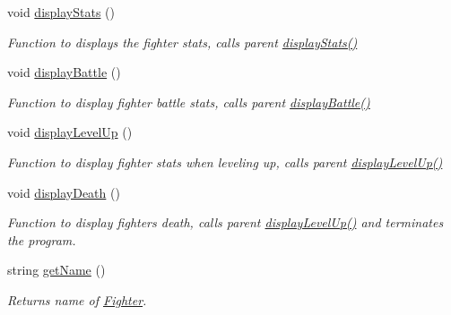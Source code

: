 \begin{DoxyCompactItemize}
\hypertarget{class_fighter_a9e63e29c35aaca0bc60ee46efe00cc62}{}\label{class_fighter_a9e63e29c35aaca0bc60ee46efe00cc62} 
void \hyperlink{class_fighter_a9e63e29c35aaca0bc60ee46efe00cc62}{display\+Stats} ()
\begin{DoxyCompactList}\small\item\em Function to displays the fighter stats, calls parent \hyperlink{class_fighter_a9e63e29c35aaca0bc60ee46efe00cc62}{display\+Stats()} \end{DoxyCompactList}\item 
\hypertarget{class_fighter_ad519375531d2f4ae2bc8896e3595d5f4}{}\label{class_fighter_ad519375531d2f4ae2bc8896e3595d5f4} 
void \hyperlink{class_fighter_ad519375531d2f4ae2bc8896e3595d5f4}{display\+Battle} ()
\begin{DoxyCompactList}\small\item\em Function to display fighter battle stats, calls parent \hyperlink{class_fighter_ad519375531d2f4ae2bc8896e3595d5f4}{display\+Battle()} \end{DoxyCompactList}\item 
\hypertarget{class_fighter_afa53e25a50772d86c5e929c6df1354ad}{}\label{class_fighter_afa53e25a50772d86c5e929c6df1354ad} 
void \hyperlink{class_fighter_afa53e25a50772d86c5e929c6df1354ad}{display\+Level\+Up} ()
\begin{DoxyCompactList}\small\item\em Function to display fighter stats when leveling up, calls parent \hyperlink{class_fighter_afa53e25a50772d86c5e929c6df1354ad}{display\+Level\+Up()} \end{DoxyCompactList}\item 
\hypertarget{class_fighter_a6a050f0b907517b09627fe16cea6e341}{}\label{class_fighter_a6a050f0b907517b09627fe16cea6e341} 
void \hyperlink{class_fighter_a6a050f0b907517b09627fe16cea6e341}{display\+Death} ()
\begin{DoxyCompactList}\small\item\em Function to display fighter\textquotesingle{}s death, calls parent \hyperlink{class_fighter_afa53e25a50772d86c5e929c6df1354ad}{display\+Level\+Up()} and terminates the program. \end{DoxyCompactList}\item 
\hypertarget{class_fighter_abf4d82d4a17d37d3b5ca4084debabde4}{}\label{class_fighter_abf4d82d4a17d37d3b5ca4084debabde4} 
string \hyperlink{class_fighter_abf4d82d4a17d37d3b5ca4084debabde4}{get\+Name} ()
\begin{DoxyCompactList}\small\item\em Returns name of \hyperlink{class_fighter}{Fighter}. \end{DoxyCompactList}\item 

\end{DoxyCompactItemize}
